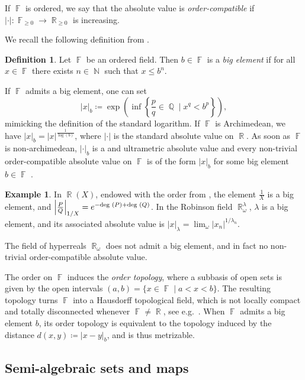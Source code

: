 \documentclass{amsart}
\theoremstyle{plain}
\theoremstyle{definition}
\newtheorem{example}[proposition]{Example}
\newtheorem{definition}[proposition]{Definition}
\DeclareMathOperator{\N}{{\mathbb{N}}}
\DeclareMathOperator{\Fb}{{\mathbb{F}}}
\DeclareMathOperator{\Rb}{{\mathbb{R}}}
\DeclareMathOperator{\Qb}{\mathbb{Q}}
\newcommand{\abs}[1]{\left|#1\right|}
\newcommand{\1}{\mathbf{1}}
\begin{document}
If $\Fb$ is ordered, we say that the absolute value is \emph{order-compatible} if $\vert \cdot \vert : \Fb_{\geq 0} \to \Rb_{\geq 0}$ is increasing.

We recall the following definition from \cite[\S 5]{Brumfiel_RSCTeichmullerSpace}.
\begin{definition}
\label{def: big element}
    Let $\Fb$ be an ordered field.
    Then $b\in \Fb$ is a \emph{big element} if for all $x\in \Fb$ there exists $n\in \N$ such that $x \leq b^n$.
\end{definition}

If $\Fb$ admits a big element, one can set 
\[ \abs{x}_b \coloneqq \exp\left(\inf\left\{\frac{p}{q} \in \Qb \mid x^q<b^p\right\}\right),\]
mimicking the definition of the standard logarithm. If $\Fb$ is Archimedean, we have $\abs{x}_b = \abs{x}^{\frac{1}{\log(b)}}$, where $\abs{\cdot}$ is the standard absolute value on $\Rb$. As soon as $\Fb$ is non-archimedean, $\abs{\cdot}_b$ is a and ultrametric absolute value and every non-trivial order-compatible absolute value on $\Fb$ is of the form $\abs{x}_b$ for some big element $b\in\Fb$ \cite[Lemma 10.11]{Flamm}.

\begin{example}
    In $\Rb(X)$, endowed with the order from , the element $\tfrac{1}{X}$ is a big element, and $\abs{\tfrac{P}{Q}}_{1/X} = e^{-\textnormal{deg } (P)+ \textnormal{deg }(Q)}$.
    In the Robinson field $\Rb_\omega^\lambda$, $\lambda$ is a big element, and its associated absolute value is $\abs{x}_\lambda= \lim_\omega \vert x_n\vert^{1/\lambda_n}$.
    
    The field of hyperreals $\Rb_\omega$ does not admit a big element, and in fact no non-trivial order-compatible absolute value.
\end{example}


The order on $\Fb$ induces the \emph{order topology}, where a subbasis of open sets is given by the open intervals $(a,b) = \{ x \in \Fb \mid a<x<b\}$.
The resulting topology turns $\Fb$ into a Hausdorff topological field, which is not locally compact and totally disconnected whenever $\Fb \neq \Rb$, see e.g.\ \cite[Remark 1.2.12 (4), Exercise 1.2.2]{Scheiderer_RAG}. 
When $\Fb$ admits a big element $b$, its order topology is equivalent to the topology induced by the distance $d(x,y) \coloneqq |x-y|_b$, and is thus metrizable.


\subsection{Semi-algebraic sets and maps}
\label{section:SemiAlgSets}
\end{document}
